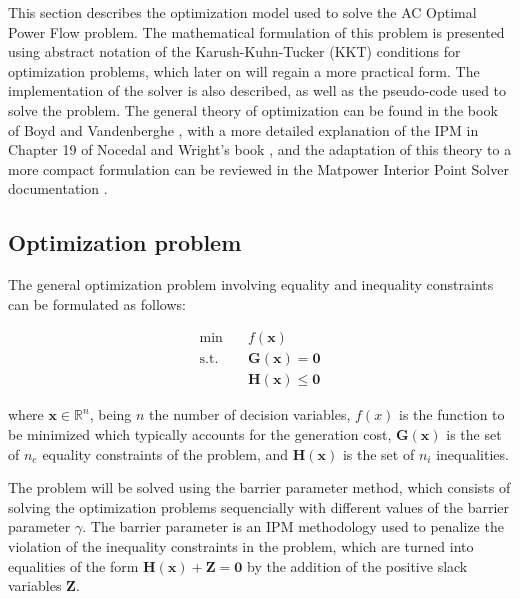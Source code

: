 
This section describes the optimization model used to solve the AC Optimal Power Flow problem. The mathematical formulation
of this problem is presented using abstract notation of the Karush-Kuhn-Tucker (KKT) conditions for optimization problems, which later on
will regain a more practical form. The implementation of the solver is also described, as well as the pseudo-code used to
solve the problem. The general theory of optimization can be found in the book of Boyd and Vandenberghe \cite{boyd2004convex}, with a more detailed explanation of the IPM in Chapter 19 of
Nocedal and Wright's book \cite{NocedalWright}, and the adaptation of this theory to a more compact formulation can be reviewed in the Matpower Interior
Point Solver documentation \cite{zimmerman2016mips} \cite{wang2007computational}.


\subsection{Optimization problem}

The general optimization problem involving equality and inequality constraints can be formulated as follows:

\begin{equation}
    \begin{split}
        \text{min} \quad & f(\bm{x}) \\
        \text{s.t.} \quad & \bm{G}(\bm{x}) = \bm{0} \\
         & \bm{H}(\bm{x}) \leq \bm{0}
    \end{split}
    \label{eq:opt_prob}
\end{equation}

where $\bm{x} \in \mathbb{R}^n$, being $n$ the number of decision variables, $f(x)$ is the function to be minimized which typically 
accounts for the generation cost, $\bm{G}(\bm{x})$ is the set of $n_e$ equality constraints of the problem, and $\bm{H}(\bm{x})$ is the set of $n_i$ inequalities. 

The problem will be solved using the barrier parameter method, which consists of solving the optimization problems sequencially with
different values of the barrier parameter $\gamma$. The barrier parameter is an IPM methodology used to penalize the violation of the inequality 
constraints in the problem, which are turned into equalities of the form $\bm{H(x)} + \bm{Z} = \bm{0}$ by the addition of the positive slack variables $\bm{Z}$.

